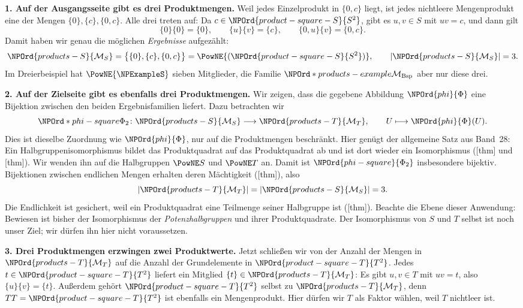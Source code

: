 \medskip\noindent\textbf{1. Auf der Ausgangsseite gibt es drei Produktmengen.}
Weil jedes Einzelprodukt in \(\{0,c\}\) liegt, ist jedes nichtleere
Mengenprodukt eine der Mengen \(\{0\},\{c\},\{0,c\}\).
Alle drei treten auf: Da \(c\in \NPOrd{product-square-S}{S^2}\), gibt es \(u,v\in S\)
mit \(uv=c\), und dann gilt
\[
 \{0\}\{0\}=\{0\},\qquad
 \{u\}\{v\}=\{c\},\qquad
 \{0,u\}\{v\}=\{0,c\}.
\]
Damit haben wir genau die möglichen \emph{Ergebnisse} aufgezählt:
\[
 \NPOrd{products-S}{\mathcal M_S}=\bigl\{\{0\},\{c\},\{0,c\}\bigr\}
             =\PowNE{(\NPOrd{product-square-S}{S^2})},\qquad |\NPOrd{products-S}{\mathcal M_S}|=3.
\]
Im Dreierbeispiel hat \(\PowNE{\NPExampleS}\) sieben Mitglieder, die Familie
\(\NPOrd*{products-example}{\mathcal M_{\mathrm{Bsp}}}\) aber nur diese drei.

\medskip\noindent\textbf{2. Auf der Zielseite gibt es ebenfalls drei Produktmengen.}
Wir zeigen, dass die gegebene Abbildung \(\NPOrd{phi}{\Phi}\) eine Bijektion
zwischen den beiden Ergebnisfamilien liefert. Dazu betrachten wir
\[
 \NPOrd*{phi-square}{\Phi_2}\colon\NPOrd{products-S}{\mathcal M_S}\longrightarrow\NPOrd{products-T}{\mathcal M_T},
 \qquad U\longmapsto\NPOrd{phi}{\Phi}(U).
\]
Dies ist dieselbe Zuordnung wie \(\NPOrd{phi}{\Phi}\), nur auf die Produktmengen
beschränkt. Hier genügt der allgemeine Satz aus Band~28:
Ein Halbgruppenisomorphismus bildet das Produktquadrat auf das
Produktquadrat ab und ist dort wieder ein Isomorphismus
([thm] und
[thm]).
Wir wenden ihn auf die Halbgruppen \(\PowNE S\) und \(\PowNE T\) an.
Damit ist \(\NPOrd{phi-square}{\Phi_2}\) insbesondere bijektiv. Bijektionen
zwischen endlichen Mengen erhalten deren Mächtigkeit
([thm]), also
\[
 \lvert\NPOrd{products-T}{\mathcal M_T}\rvert
 =\lvert\NPOrd{products-S}{\mathcal M_S}\rvert=3.
\]
Die Endlichkeit ist gesichert, weil ein Produktquadrat eine Teilmenge
seiner Halbgruppe ist ([thm]).
Beachte die Ebene dieser Anwendung: Bewiesen ist bisher der
Isomorphismus der \emph{Potenzhalbgruppen} und ihrer Produktquadrate.
Der Isomorphismus von \(S\) und \(T\) selbst ist noch unser Ziel;
wir dürfen ihn hier nicht voraussetzen.

\par{}
\medskip\noindent\textbf{3. Drei Produktmengen erzwingen zwei Produktwerte.}
Jetzt schließen wir von der Anzahl der Mengen in \(\NPOrd{products-T}{\mathcal M_T}\)
auf die Anzahl der Grundelemente in \(\NPOrd{product-square-T}{T^2}\).
Jedes \(t\in \NPOrd{product-square-T}{T^2}\) liefert ein Mitglied \(\{t\}\in\NPOrd{products-T}{\mathcal M_T}\):
Es gibt \(u,v\in T\) mit \(uv=t\), also
\(\{u\}\{v\}=\{t\}\). Außerdem gehört \(\NPOrd{product-square-T}{T^2}\) selbst zu
\(\NPOrd{products-T}{\mathcal M_T}\), denn \(TT=\NPOrd{product-square-T}{T^2}\) ist ebenfalls ein Mengenprodukt.
Hier dürfen wir \(T\) als Faktor wählen, weil \(T\) nichtleer ist.

